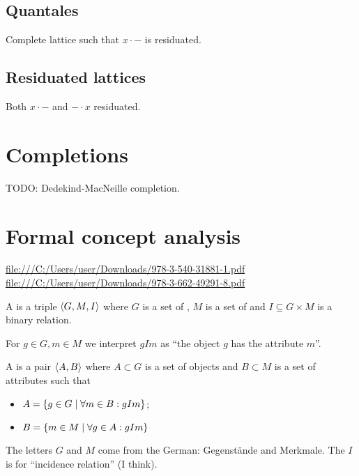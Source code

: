 \subsection{Quantales}
Complete lattice such that $x\cdot -$ is residuated.

\subsection{Residuated lattices}
Both $x \cdot -$ and $-\cdot x$ residuated.


\section{Completions}
TODO: Dedekind-MacNeille completion.

\section{Formal concept analysis}
\url{file:///C:/Users/user/Downloads/978-3-540-31881-1.pdf}
\url{file:///C:/Users/user/Downloads/978-3-662-49291-8.pdf}

\begin{definition}
A  is a triple $\left\langle G,M,I \right\rangle$ where $G$ is a set of , $M$ is a set of  and $I\subseteq G\times M$ is a binary relation.

For $g\in G, m\in M$ we interpret $gIm$ as ``the object $g$ has the attribute $m$''.



A  is a pair $\left\langle A,B \right\rangle$ where $A\subset G$ is a set of objects and $B\subset M$ is a set of attributes such that
\begin{itemize}
\item $A = \setbuilder{g\in G}{\forall m\in B: gIm}$;
\item $B = \setbuilder{m\in M}{\forall g\in A: gIm}$
\end{itemize}
\end{definition}
The letters $G$ and $M$ come from the German: Gegenstände and Merkmale. The $I$ is for ``incidence relation'' (I think).

